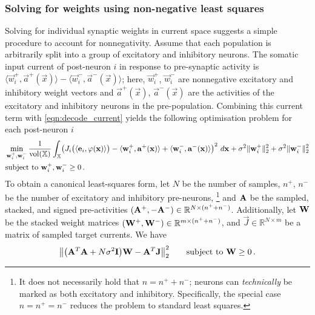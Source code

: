 \subsubsection{Solving for weights using non-negative least squares}
Solving for individual synaptic weights in current space suggests a simple procedure to account for nonnegativity.
Assume that each population is arbitrarily split into a group of excitatory and inhibitory neurons.
The somatic input current of post-neuron $i$ in response to pre-synaptic activity is $\langle \vec w_i^+, \vec a^+(\vec x) \rangle - \langle \vec w_i^-, \vec a^-(\vec x) \rangle$;
here, $\vec w_i^+$, $\vec w_i^-$ are nonnegative excitatory and inhibitory weight vectors and $\vec a^+(\vec x)$, $\vec a^-(\vec x)$ are the activities of the excitatory and inhibitory neurons in the pre-population.
Combining this current term with \cref{eqn:decode_current} yields the following optimisation problem for each post-neuron $i$
\begin{align}
	\begin{aligned}
	& \min_{{\mathbf{w}}_i^+, {\mathbf{w}}_i^-}
	\frac{1}{\operatorname{vol}(\mathbb{X})} \int_{\mathbb{X}} \!
	\left(
		J_i\bigl(\langle \mathbf{e}_i, \varphi(\mathbf{x}) \rangle\bigr)
		- \langle \mathbf{w}_{i}^+, \mathbf{a}^+(\mathbf{x}) \rangle
		+ \langle \mathbf{w}_{i}^-, \mathbf{a}^-(\mathbf{x}) \rangle
	\right)^2 \, d\mathbf{x} + \sigma^2 \|\mathbf{w}_{i}^+\|_2^2 + \sigma^2 \|\mathbf{w}_{i}^-\|_2^2 \\
	& \text{subject to } \mathbf{w}_i^+, \mathbf{w}_i^- \geq 0 \,.
	\end{aligned}
	\label{eqn:decode_nonneg}
\end{align}
To obtain a canonical least-squares form, let $N$ be the number of samples, $n^+$, $n^-$ be the number of excitatory and inhibitory pre-neurons,%
\footnote{
It does not necessarily hold that $n = n^+ + n^-$; neurons can \emph{technically} be marked as both excitatory and inhibitory. Specifically, the special case $n = n^+ = n^-$ reduces the \NNLS problem to standard least squares.
}
and $\mathbf{A}$ be the sampled, stacked, and signed pre-activities $(\mathbf{A}^+, -\mathbf{A}^-) \in \mathbb{R}^{N \times (n^+ + n^-)}$.
Additionally, let $\mathbf{W}$ be the stacked weight matrices $(\mathbf{W}^+, \mathbf{W}^-) \in \mathbb{R}^{m \times (n^+ + n^-)}$, and $\vec J \in \mathbb{R}^{N \times m}$ be a matrix of sampled target currents. We have
\begin{align}
	\bigl\| \bigl( \mathbf{A}^T \mathbf{A} + N \sigma^2 \mathbf{I} \bigr) \mathbf{W} - \mathbf{A}^T \mathbf{J} \bigr\|_2^2 \quad\quad \text{subject to } \mathbf{W} \geq 0 \,.
	\label{eqn:decode_nonneg_canon}
\end{align}
